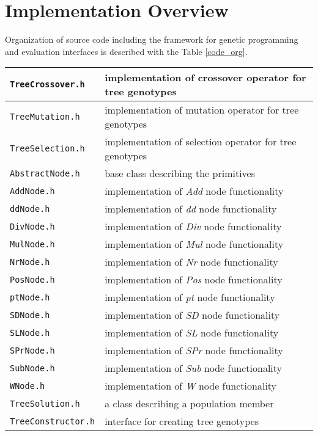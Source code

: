 \chapter{Implementation Overview}
\label{implementation}
Organization of source code including the framework for genetic programming and evaluation interfaces is described with the Table \ref{code_org}.
\begin{longtable}{| p{} | p{} |}
\hline
\texttt{TreeCrossover.h}    & implementation of crossover operator for tree genotypes \\ \hline
\texttt{TreeMutation.h}  & implementation of mutation operator for tree genotypes \\ \hline
\texttt{TreeSelection.h} & implementation of selection operator for tree genotypes  \\ \hline
\texttt{AbstractNode.h} & base class describing the primitives \\ \hline
\texttt{AddNode.h} & implementation of \textit{Add} node functionality \\ \hline
\texttt{ddNode.h} & implementation of \textit{dd} node functionality \\ \hline
\texttt{DivNode.h} & implementation of \textit{Div} node functionality \\ \hline
\texttt{MulNode.h} & implementation of \textit{Mul} node functionality \\ \hline
\texttt{NrNode.h} & implementation of \textit{Nr} node functionality  \\\hline
\texttt{PosNode.h} & implementation of \textit{Pos} node functionality \\ \hline
\texttt{ptNode.h} & implementation of \textit{pt} node functionality \\ \hline
\texttt{SDNode.h} & implementation of \textit{SD} node functionality \\ \hline
\texttt{SLNode.h} & implementation of \textit{SL} node functionality \\ \hline
\texttt{SPrNode.h} & implementation of \textit{SPr} node functionality \\ \hline
\texttt{SubNode.h} & implementation of \textit{Sub} node functionality \\ \hline
\texttt{WNode.h} & implementation of \textit{W} node functionality \\ \hline
\texttt{TreeSolution.h} & a class describing a population member \\ \hline
\texttt{TreeConstructor.h} & interface for creating tree genotypes \\ \hline

\end{longtable}
